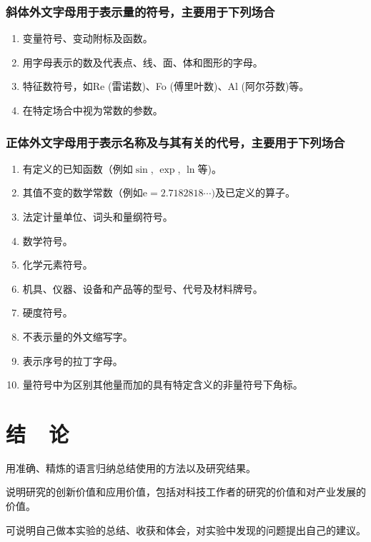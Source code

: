 \documentclass{gjm_report}
\begin{document}
\begin{multicols}{2}
    \subsubsection{斜体外文字母用于表示量的符号，主要用于下列场合}

    \begin{enumerate}
    \renewcommand{\labelenumi}{(\theenumi)}
      \item 变量符号、变动附标及函数。
      \item 用字母表示的数及代表点、线、面、体和图形的字母。
      \item 特征数符号，如Re (雷诺数)、Fo (傅里叶数)、Al (阿尔芬数)等。
      \item 在特定场合中视为常数的参数。
    \end{enumerate} 

    \subsubsection{正体外文字母用于表示名称及与其有关的代号，主要用于下列场合}
      \begin{enumerate}
      \renewcommand{\labelenumi}{(\theenumi)}
        \item 有定义的已知函数（例如$\sin$, $\exp$, $\ln$等)。
        \item 其值不变的数学常数（例如$\mathrm{e} = 2.7        18 281 8\cdots)$及已定义的算子。
        \item 法定计量单位、词头和量纲符号。
        \item 数学符号。
        \item 化学元素符号。
        \item 机具、仪器、设备和产品等的型号、代号及材料牌号。
        \item 硬度符号。
        \item 不表示量的外文缩写字。
        \item 表示序号的拉丁字母。
        \item 量符号中为区别其他量而加的具有特定含义的非量符号下角标。
      \end{enumerate} 

\section{结~~论}
  用准确、精炼的语言归纳总结使用的方法以及研究结果。

  说明研究的创新价值和应用价值，包括对科技工作者的研究的价值和对产业发展的价值。

  可说明自己做本实验的总结、收获和体会，对实验中发现的问题提出自己的建议。
  
  
\end{multicols}
\end{document}
